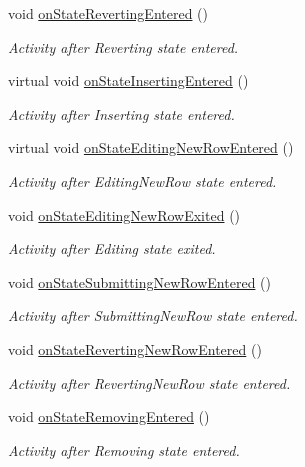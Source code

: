 \begin{DoxyCompactItemize}
void \hyperlink{classmdt_abstract_sql_table_controller_ae08f954918538cbdd1257d4fecef184e}{on\-State\-Reverting\-Entered} ()
\begin{DoxyCompactList}\small\item\em Activity after Reverting state entered. \end{DoxyCompactList}\item 
virtual void \hyperlink{classmdt_abstract_sql_table_controller_a62b31d537021405a6b28e74dc5c6cdd9}{on\-State\-Inserting\-Entered} ()
\begin{DoxyCompactList}\small\item\em Activity after Inserting state entered. \end{DoxyCompactList}\item 
virtual void \hyperlink{classmdt_abstract_sql_table_controller_a6a17e3453d754109711fa372b2a1a344}{on\-State\-Editing\-New\-Row\-Entered} ()
\begin{DoxyCompactList}\small\item\em Activity after Editing\-New\-Row state entered. \end{DoxyCompactList}\item 
void \hyperlink{classmdt_abstract_sql_table_controller_a6700c4d17a701cf3758e4e43ac1ccb05}{on\-State\-Editing\-New\-Row\-Exited} ()
\begin{DoxyCompactList}\small\item\em Activity after Editing state exited. \end{DoxyCompactList}\item 
void \hyperlink{classmdt_abstract_sql_table_controller_ac05b5fced9eef33ad1bb7442af991ab6}{on\-State\-Submitting\-New\-Row\-Entered} ()
\begin{DoxyCompactList}\small\item\em Activity after Submitting\-New\-Row state entered. \end{DoxyCompactList}\item 
void \hyperlink{classmdt_abstract_sql_table_controller_a6d27343c80072d91d7c8ecf15cfde94d}{on\-State\-Reverting\-New\-Row\-Entered} ()
\begin{DoxyCompactList}\small\item\em Activity after Reverting\-New\-Row state entered. \end{DoxyCompactList}\item 
void \hyperlink{classmdt_abstract_sql_table_controller_acb2f06b1b4cb4ec4af3f4695aa9ab0e4}{on\-State\-Removing\-Entered} ()
\begin{DoxyCompactList}\small\item\em Activity after Removing state entered. \end{DoxyCompactList}\end{DoxyCompactItemize}

